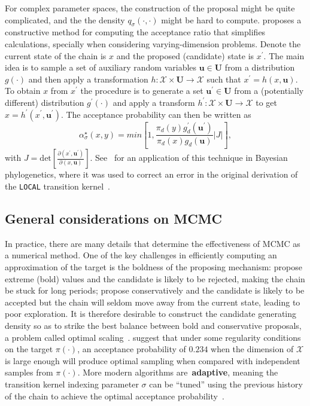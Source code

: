 For complex parameter spaces, the construction of the proposal might be quite complicated, and the the density  $q_\sigma(\cdot, \cdot)$ might be hard to compute.
\citep{Green2003} proposes a constructive method for computing the acceptance ratio that simplifies calculations, specially when considering varying-dimension problems.
Denote the current state of the chain is $x$ and the proposed (candidate) state is $x^\prime$.
The main idea is to sample a set of auxiliary random variables $\boldsymbol u \in \boldsymbol U$ from a distribution $g(\cdot)$ and then apply a transformation $h : \mathcal{X} \times \boldsymbol U \to \mathcal{X} $ such that $x^\prime = h(x, \boldsymbol u)$.
To obtain $x$ from $x^\prime$ the procedure is to generate a set $\boldsymbol u^\prime \in \boldsymbol U$ from a (potentially different) distribution $g^\prime(\cdot)$ and apply a transform $h^\prime : \mathcal{X} \times \boldsymbol U \to \mathcal{X}$ to get $x = h^\prime(x^\prime, \boldsymbol u^\prime)$.
The acceptance probability can then be written as 
\[
 \alpha^\star_\sigma(x, y) = min \left[1, \frac{\pi_d(y) g_d^\prime(\boldsymbol u^\prime)}{\pi_d(x) g_d(\boldsymbol u)} |J| \right],
\]
with $J = \text{det} \left[\frac{\partial (x^\prime, \boldsymbol u^\prime) }{\partial (x, \boldsymbol u)} \right]$.
See~\cite{Holder2005} for an application of this technique in Bayesian phylogenetics, where it was used to correct an error in the original derivation of the \verb|LOCAL| transition kernel~\citep{Larget1999}.


\subsection{General considerations on MCMC}
\label{sec:practical}

In practice, there are many details that determine the effectiveness of MCMC as a numerical method.
One of the key challenges in efficiently computing an approximation of the target is the boldness of the proposing mechanism: propose extreme (bold) values and the candidate is likely to be rejected, making the chain be stuck for long periods; propose conservatively and the candidate is likely to be accepted but the chain will seldom move away from the current state, leading to poor exploration.
It is therefore desirable to construct the candidate generating density so as to strike the best balance between bold and conservative proposals, a problem called optimal scaling~\citep{Roberts1998,Roberts2001}.
\cite{Gelman1996} suggest that under some regularity conditions on the target $\pi(\cdot)$, an acceptance probability of $0.234$ when the dimension of $\mathcal{X}$ is large enough will produce optimal sampling when compared with independent samples from $\pi(\cdot)$. 
More modern algorithms are~\textbf{adaptive}, meaning the transition kernel indexing parameter $\sigma$ can be ``tuned'' using the previous history of the chain to achieve the optimal acceptance probability~\citep{Haario2001}.

